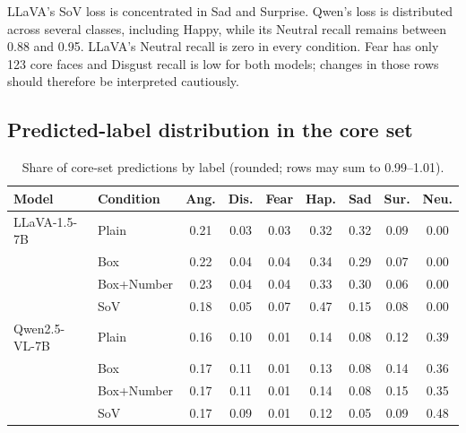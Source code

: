 \documentclass[lettersize,journal]{IEEEtran}
\begin{document}
LLaVA's SoV loss is concentrated in Sad and Surprise. Qwen's loss is distributed across several classes, including Happy, while its Neutral recall remains between 0.88 and 0.95. LLaVA's Neutral recall is zero in every condition. Fear has only 123 core faces and Disgust recall is low for both models; changes in those rows should therefore be interpreted cautiously.

\subsection{Predicted-label distribution in the core set}
\begin{table}[!t]
\caption{Share of core-set predictions by label (rounded; rows may sum to 0.99--1.01).}
\label{tab:app_shares}
\centering
\scriptsize
\setlength{\tabcolsep}{3pt}
\begin{tabular}{llccccccc}
\toprule
Model & Condition & Ang. & Dis. & Fear & Hap. & Sad & Sur. & Neu. \\
\midrule
LLaVA-1.5-7B & Plain & 0.21 & 0.03 & 0.03 & 0.32 & 0.32 & 0.09 & 0.00 \\
& Box & 0.22 & 0.04 & 0.04 & 0.34 & 0.29 & 0.07 & 0.00 \\
& Box+Number & 0.23 & 0.04 & 0.04 & 0.33 & 0.30 & 0.06 & 0.00 \\
& SoV & 0.18 & 0.05 & 0.07 & 0.47 & 0.15 & 0.08 & 0.00 \\
\midrule
Qwen2.5-VL-7B & Plain & 0.16 & 0.10 & 0.01 & 0.14 & 0.08 & 0.12 & 0.39 \\
& Box & 0.17 & 0.11 & 0.01 & 0.13 & 0.08 & 0.14 & 0.36 \\
& Box+Number & 0.17 & 0.11 & 0.01 & 0.14 & 0.08 & 0.15 & 0.35 \\
& SoV & 0.17 & 0.09 & 0.01 & 0.12 & 0.05 & 0.09 & 0.48 \\
\bottomrule
\end{tabular}
\end{table}
\end{document}
